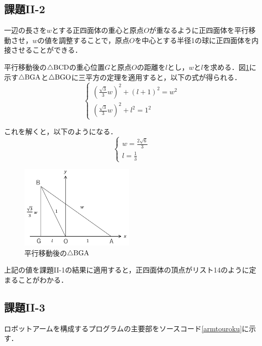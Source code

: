 \documentclass[]{jsarticle}
\begin{document}
\subsection{課題II-2}
一辺の長さを$w$とする正四面体の重心と原点$O$が重なるように正四面体を平行移動させ，$w$の値を調整することで，原点$O$を中心とする半径1の球に正四面体を内接させることができる．

平行移動後の$\triangle{\rm{BCD}}$の重心位置$G$と原点$O$の距離を$l$とし，$w$と$l$を求める．図\ref{fig:bga2}に示す$\triangle{\rm{BGA}}$と$\triangle{\rm{BGO}}$に三平方の定理を適用すると，以下の式が得られる．
\begin{displaymath}
\left\{
\begin{array}{l}
\left( \frac{\sqrt{3}}{3}w \right)^2 + (l + 1)^2 = w^2 \\
\left( \frac{\sqrt{3}}{3}w \right)^2 + l^2 = 1^2
\end{array}
\right.
\end{displaymath}

これを解くと，以下のようになる．
\begin{displaymath}
\left\{
\begin{array}{l}
w = \frac{2\sqrt{6}}{3} \\
l = \frac{1}{3}
\end{array}
\right.
\end{displaymath}
\begin{figure}[htbp]
\begin{center}
\includegraphics[height=4cm,keepaspectratio]{BGA2.jpg}
    \caption{平行移動後の$\triangle{\rm{BGA}}$}
    \label{fig:bga2}
\end{center}
\end{figure}

上記の値を課題II-1の結果に適用すると，正四面体の頂点がリスト14のように定まることがわかる．

\subsection{課題II-3}
ロボットアームを構成するプログラムの主要部をソースコード\ref{armtouroku}に示す．
\end{document}
